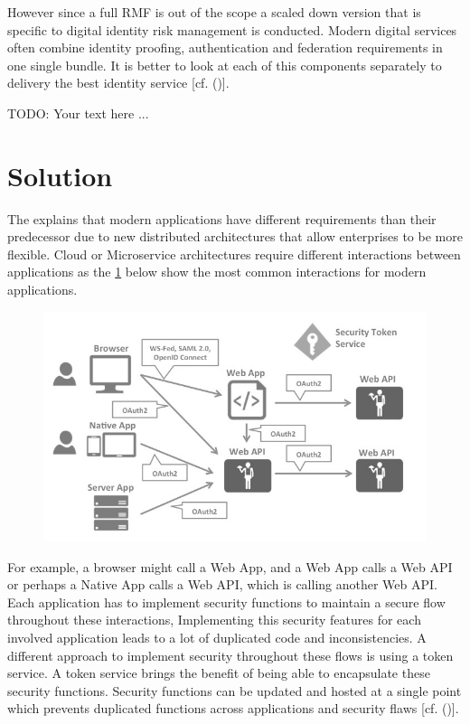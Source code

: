 However since a full RMF is out of the scope a scaled down version that is specific to digital identity risk management is conducted. Modern digital services often combine identity proofing, authentication and federation requirements in one single bundle. It is better to look at each of this components separately to delivery the best identity service [cf. (\cite{NIST:2017:DIG})].  

TODO: Your text here ...


\section{Solution}
The \cite{Sakimura:2014:OpenIDConnect} explains that modern applications have different requirements than their predecessor due to new distributed architectures that allow enterprises to be more flexible. Cloud or Microservice architectures require different interactions between applications as the \ref{fig:architecture-identityserver} below show the most common interactions for modern applications.

\begin{figure}[h]
	\centering
	\includegraphics[width=0.8\linewidth]{images/architecture-identityserver}
	\caption[Architecture IdentityServer4]{}
	\caption{}
	\label{fig:architecture-identityserver}
\end{figure}



For example, a browser might call a Web App, and a Web App calls a Web API or perhaps a Native App calls a Web API, which is calling another Web API. Each application has to implement security functions to maintain a secure flow throughout these interactions, Implementing this security features for each involved application leads to a lot of duplicated code and inconsistencies. A different approach to implement security throughout these flows is using a token service. A token service brings the benefit of being able to encapsulate these security functions. Security functions can be updated and hosted at a single point which prevents duplicated functions across applications and security flaws [cf. (\cite{Sakimura:2014:OpenIDConnect})].

